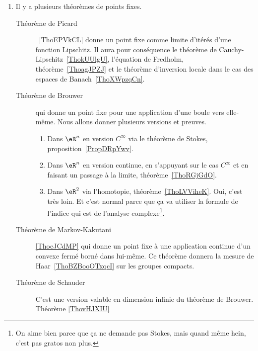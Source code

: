         \label{THEMEooWAYJooUSnmMh}
    \begin{enumerate}
\item
    Il y a plusieurs théorèmes de points fixes.
    \begin{description}
        \item[Théorème de Picard]~\ref{ThoEPVkCL} donne un point fixe comme limite d'itérés d'une fonction Lipschitz. Il aura pour conséquence le théorème de Cauchy-Lipschitz~\ref{ThokUUlgU}, l'équation de Fredholm, théorème~\ref{ThoagJPZJ} et le théorème d'inversion locale dans le cas des espaces de Banach~\ref{ThoXWpzqCn}.
    \item[Théorème de Brouwer] qui donne un point fixe pour une application d'une boule vers elle-même. Nous allons donner plusieurs versions et preuves.
            \begin{enumerate}
                \item
                    Dans \( \eR^n\) en version \( C^{\infty}\) via le théorème de Stokes, proposition~\ref{PropDRpYwv}.
                \item
                    Dans \( \eR^n\) en version continue, en s'appuyant sur le cas \( C^{\infty}\) et en faisant un passage à la limite, théorème~\ref{ThoRGjGdO}.
                \item
                    Dans \( \eR^2\) via l'homotopie, théorème~\ref{ThoLVViheK}. Oui, c'est très loin. Et c'est normal parce que ça va utiliser la formule de l'indice qui est de l'analyse complexe\footnote{On aime bien parce que ça ne demande pas Stokes, mais quand même hein, c'est pas gratos non plus.}.
            \end{enumerate}
        \item[Théorème de Markov-Kakutani]\ref{ThoeJCdMP} qui donne un point fixe à une application continue d'un convexe fermé borné dans lui-même. Ce théorème donnera la mesure de Haar~\ref{ThoBZBooOTxqcI} sur les groupes compacts.
        \item[Théorème de Schauder] C'est une version valable en dimension infinie du théorème de Brouwer. Théorème \ref{ThovHJXIU} 
    \end{description}


\end{enumerate}
